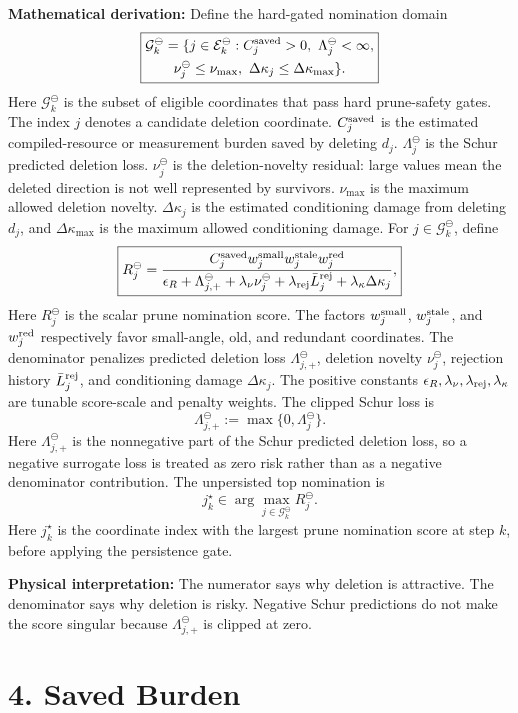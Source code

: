 \documentclass[10pt,twocolumn]{article}
\newcommand{\blk}[1]{\vspace{3pt}\noindent\textbf{#1:}\quad}
\newcommand{\Edel}{\mathcal E_k^{\ominus}}
\newcommand{\Gdel}{\mathcal G_k^{\ominus}}
\newcommand{\Lam}{\Lambda_j^{\ominus}}
\newcommand{\nudel}{\nu_j^{\ominus}}
\newcommand{\Rdel}{R_j^{\ominus}}
\begin{document}
\blk{Mathematical derivation}
Define the hard-gated nomination domain
\[
\boxed{
\begin{gathered}
\Gdel=
\{j\in\Edel:
C_j^{\rm saved}>0,\ \Lam<\infty,\\
\nudel\le\nu_{\max},\
\Delta\kappa_j\le\Delta\kappa_{\max}\}.
\end{gathered}
}
\]
Here \(\Gdel\) is the subset of eligible coordinates that pass hard prune-safety gates. The index \(j\) denotes a candidate deletion coordinate. \(C_j^{\rm saved}\) is the estimated compiled-resource or measurement burden saved by deleting \(d_j\). \(\Lam\) is the Schur predicted deletion loss. \(\nudel\) is the deletion-novelty residual: large values mean the deleted direction is not well represented by survivors. \(\nu_{\max}\) is the maximum allowed deletion novelty. \(\Delta\kappa_j\) is the estimated conditioning damage from deleting \(d_j\), and \(\Delta\kappa_{\max}\) is the maximum allowed conditioning damage.
For \(j\in\Gdel\), define
\[
\boxed{
\Rdel
=
\frac{
C_j^{\rm saved}
w_j^{\rm small}
w_j^{\rm stale}
w_j^{\rm red}
}{
\epsilon_R
+\Lambda_{j,+}^{\ominus}
+\lambda_\nu\nudel
+\lambda_{\rm rej}\bar L_j^{\rm rej}
+\lambda_\kappa\Delta\kappa_j
},
}
\]
Here \(\Rdel\) is the scalar prune nomination score. The factors \(w_j^{\rm small}\), \(w_j^{\rm stale}\), and \(w_j^{\rm red}\) respectively favor small-angle, old, and redundant coordinates. The denominator penalizes predicted deletion loss \(\Lambda_{j,+}^{\ominus}\), deletion novelty \(\nudel\), rejection history \(\bar L_j^{\rm rej}\), and conditioning damage \(\Delta\kappa_j\). The positive constants \(\epsilon_R,\lambda_\nu,\lambda_{\rm rej},\lambda_\kappa\) are tunable score-scale and penalty weights.
The clipped Schur loss is
\[
\Lambda_{j,+}^{\ominus}:=\max\{0,\Lam\}.
\]
Here \(\Lambda_{j,+}^{\ominus}\) is the nonnegative part of the Schur predicted deletion loss, so a negative surrogate loss is treated as zero risk rather than as a negative denominator contribution.
The unpersisted top nomination is
\[
\boxed{
j_k^\star\in\arg\max_{j\in\Gdel}\Rdel .
}
\]
Here \(j_k^\star\) is the coordinate index with the largest prune nomination score at step \(k\), before applying the persistence gate.

\blk{Physical interpretation}
The numerator says why deletion is attractive. The denominator says why deletion is risky. Negative Schur predictions do not make the score singular because \(\Lambda_{j,+}^{\ominus}\) is clipped at zero.

\section*{4. Saved Burden}
\end{document}
